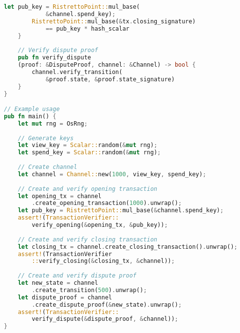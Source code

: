 \documentclass[11pt]{amsart}
\begin{document}
\begin{lstlisting}[language=Rust]
		let pub_key = RistrettoPoint::mul_base(
			&channel.spend_key);
		RistrettoPoint::mul_base(&tx.closing_signature)
			== pub_key * hash_scalar
	}
	
	// Verify dispute proof
	pub fn verify_dispute
	(proof: &DisputeProof, channel: &Channel) -> bool {
		channel.verify_transition(
			&proof.state, &proof.state_signature)
	}
}

// Example usage
pub fn main() {
	let mut rng = OsRng;
	
	// Generate keys
	let view_key = Scalar::random(&mut rng);
	let spend_key = Scalar::random(&mut rng);
	
	// Create channel
	let channel = Channel::new(1000, view_key, spend_key);
	
	// Create and verify opening transaction
	let opening_tx = channel
		.create_opening_transaction(1000).unwrap();
	let pub_key = RistrettoPoint::mul_base(&channel.spend_key);
	assert!(TransactionVerifier::
		verify_opening(&opening_tx, &pub_key));
	
	// Create and verify closing transaction
	let closing_tx = channel.create_closing_transaction().unwrap();
	assert!(TransactionVerifier
		::verify_closing(&closing_tx, &channel));
	
	// Create and verify dispute proof
	let new_state = channel
		.create_transition(500).unwrap();
	let dispute_proof = channel
		.create_dispute_proof(&new_state).unwrap();
	assert!(TransactionVerifier::
		verify_dispute(&dispute_proof, &channel));
}
\end{lstlisting}
\end{document}
